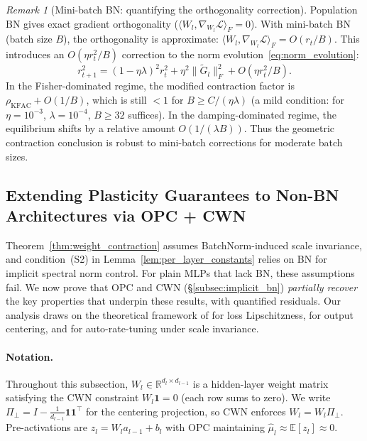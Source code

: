 \documentclass{article}
\providecommand{\R}{\mathbb{R}}
\providecommand{\E}{\mathbb{E}}
\providecommand{\norm}[1]{\lVert #1 \rVert}
\theoremstyle{plain}
\theoremstyle{definition}
\theoremstyle{remark}
\newtheorem{remark}{Remark}
\begin{document}
\begin{remark}[Mini-batch BN: quantifying the orthogonality correction]
\label{rem:bn_minibatch}
Population BN gives exact gradient orthogonality ($\langle W_l, \nabla_{W_l}\mathcal{L}\rangle_F = 0$). With mini-batch BN (batch size $B$), the orthogonality is approximate: $\langle W_l, \nabla_{W_l}\mathcal{L}\rangle_F = O(r_t/B)$. This introduces an $O(\eta r_t^2/B)$ correction to the norm evolution~\eqref{eq:norm_evolution}:
\begin{equation}
    r_{t+1}^2 = (1-\eta\lambda)^2 r_t^2 + \eta^2\norm{\tilde{G}_l}_F^2 + O(\eta r_t^2/B).
\end{equation}
In the Fisher-dominated regime, the modified contraction factor is $\rho_{\mathrm{KFAC}} + O(1/B)$, which is still $< 1$ for $B \geq C/(\eta\lambda)$ (a mild condition: for $\eta = 10^{-3}$, $\lambda = 10^{-4}$, $B \geq 32$ suffices). In the damping-dominated regime, the equilibrium shifts by a relative amount $O(1/(\lambda B))$. Thus the geometric contraction conclusion is robust to mini-batch corrections for moderate batch sizes.
\end{remark}

\subsection{Extending Plasticity Guarantees to Non-BN Architectures via OPC + CWN}
\label{sec:opc_cwn_theory}

Theorem~\ref{thm:weight_contraction} assumes BatchNorm-induced scale invariance, and condition~(S2) in Lemma~\ref{lem:per_layer_constants} relies on BN for implicit spectral norm control. For plain MLPs that lack BN, these assumptions fail. We now prove that OPC and CWN (\S\ref{subsec:implicit_bn}) \emph{partially recover} the key properties that underpin these results, with quantified residuals. Our analysis draws on the theoretical framework of \citet{santurkar2018does} for loss Lipschitzness, \citet{huang2017centered} for output centering, and \citet{arora2019theoretical} for auto-rate-tuning under scale invariance.

\paragraph{Notation.} Throughout this subsection, $W_l \in \R^{d_l \times d_{l-1}}$ is a hidden-layer weight matrix satisfying the CWN constraint $W_l \mathbf{1} = 0$ (each row sums to zero). We write $\Pi_\perp = I - \frac{1}{d_{l-1}}\mathbf{1}\mathbf{1}^\top$ for the centering projection, so CWN enforces $W_l = W_l \Pi_\perp$. Pre-activations are $z_l = W_l a_{l-1} + b_l$ with OPC maintaining $\hat{\mu}_l \approx \E[z_l] \approx 0$.
\end{document}

